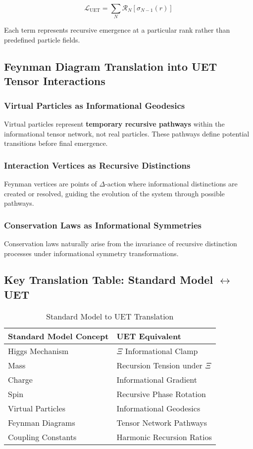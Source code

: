 \documentclass[12pt,a4paper]{article}
\begin{document}
\[
\mathcal{L}_{\text{UET}} = \sum_N \mathcal{R}_N[\sigma_{N-1}(r)]
\]

Each term represents recursive emergence at a particular rank rather than predefined particle fields.

\subsection{Feynman Diagram Translation into UET Tensor Interactions}

\subsubsection{Virtual Particles as Informational Geodesics}

Virtual particles represent \textbf{temporary recursive pathways} within the informational tensor network, not real particles. These pathways define potential transitions before final emergence.

\subsubsection{Interaction Vertices as Recursive Distinctions}

Feynman vertices are points of \(\Delta\)-action where informational distinctions are created or resolved, guiding the evolution of the system through possible pathways.

\subsubsection{Conservation Laws as Informational Symmetries}

Conservation laws naturally arise from the invariance of recursive distinction processes under informational symmetry transformations.

\subsection{Key Translation Table: Standard Model \(\leftrightarrow\) UET}

\begin{table}[h]
\centering
\begin{tabular}{|l|l|}
\hline
\textbf{Standard Model Concept} & \textbf{UET Equivalent} \\
\hline
Higgs Mechanism & \(\Xi\) Informational Clamp \\
Mass & Recursion Tension under \(\Xi\) \\
Charge & Informational Gradient \\
Spin & Recursive Phase Rotation \\
Virtual Particles & Informational Geodesics \\
Feynman Diagrams & Tensor Network Pathways \\
Coupling Constants & Harmonic Recursion Ratios \\
\hline
\end{tabular}
\caption{Standard Model to UET Translation}
\end{table}
\end{document}
